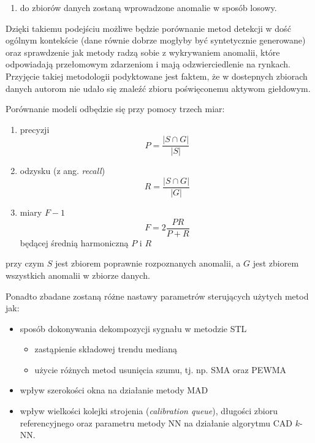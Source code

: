 \documentclass{article}
\begin{document}
\begin{enumerate}
\def\labelenumi{\arabic{enumi}.}
\setcounter{enumi}{1}
\item
  do zbiorów danych zostaną wprowadzone anomalie w sposób losowy.
\end{enumerate}

Dzięki takiemu podejściu możliwe będzie porównanie metod detekcji w dość
ogólnym kontekście (dane równie dobrze mogłyby być syntetycznie
generowane) oraz sprawdzenie jak metody radzą sobie z wykrywaniem
anomalii, które odpowiadają przełomowym zdarzeniom i mają
odzwierciedlenie na rynkach. Przyjęcie takiej metodologii podyktowane jest faktem, że w dostepnych zbiorach danych autorom nie udało się znaleźć zbioru poświęconemu aktywom giełdowym.

Porównanie modeli odbędzie się przy pomocy trzech miar:

\begin{enumerate}
\def\labelenumi{\arabic{enumi}.}
\item
  precyzji 
    \begin{equation*}
       P = \frac{|S \cap G|}{|S|}
    \end{equation*}
\item
  odzysku (z ang. \emph{recall}) 
    \begin{equation*}
      R = \frac{|S \cap G|}{|G|}
    \end{equation*}

\item
  miary $F-1$
    \begin{equation*}
    F = 2\frac{PR}{P + R}
    \end{equation*}
  będącej średnią harmoniczną \(P\) i \(R\)
\end{enumerate}

przy czym \(S\) jest zbiorem poprawnie rozpoznanych anomalii, a \(G\)
jest zbiorem wszystkich anomalii w zbiorze danych.

Ponadto zbadane zostaną różne nastawy parametrów sterujących użytych
metod jak:

\begin{itemize}
\item
  sposób dokonywania dekompozycji sygnału w metodzie STL

  \begin{itemize}
  \item
    zastąpienie składowej trendu medianą \cite{adts-cloud}
  \item
    użycie różnych metod usunięcia szumu, tj. np. SMA oraz PEWMA
  \end{itemize}
\item
  wpływ szerokości okna na działanie metody MAD
\item
  wpływ wielkości kolejki strojenia (\emph{calibration queue}), długości
  zbioru referencyjnego oraz parametru metody NN na działanie algorytmu
  CAD $k$-NN.
\end{itemize}

 

\end{document}
